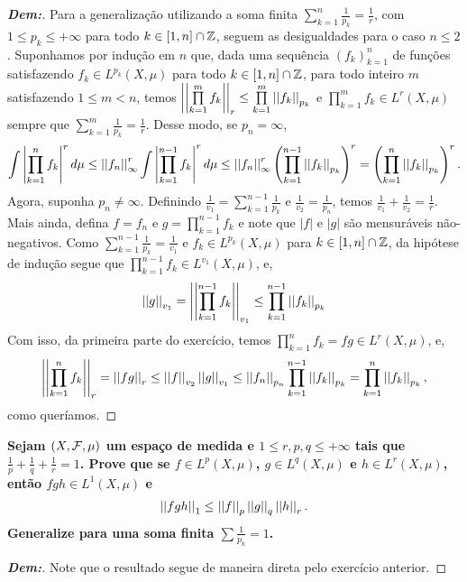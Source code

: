 \begin{proof}[\textbf{Dem:}]
  Para a generalização utilizando a soma finita 
  $\sum\limits_{k = 1}^n \frac{1}{p_k} = \frac{1}{r}$, com $1\le p_k \le +\infty$
  para todo $k \in [1, n] \cap \mbb Z$,
  seguem as desigualdades para o caso $n \le 2$. Suponhamos por indução em $n$ que, dada 
  uma sequência $(f_k)_{k=1}^n$ de funções satisfazendo $f_k \in L^{p_k}(X, \mu)$ para 
  todo $k \in [1, n] \cap \mbb Z$, 
  para todo inteiro $m$ satisfazendo $1 \le m < n$, temos 
  $\pnorm r {\prod\limits_{k = 1}^m f_k} \le \prod\limits_{k = 1}^m \pnorm {p_k} {f_k}$
  e $\prod_{k = 1}^m f_k \in L^r(X, \mu)$ sempre
  que $\sum\limits_{k = 1}^{m}\frac{1}{p_k} = \frac{1}{r}$. Desse modo, 
  se $p_n = \infty$, 
  \begin{align*}
    \int \mparth{\prod_{k = 1}^n f_k}^r d\mu 
    \le \pnorm \infty {f_n}^r \int \mparth{\prod_{k = 1}^{n-1} f_k}^r d\mu
    \le \pnorm \infty {f_n}^r \parth{\prod_{k = 1}^{n - 1}\pnorm {p_k}{f_k}}^r = 
    \parth{\prod_{k=1}^n \pnorm {p_k}{f_k}}^r.
  \end{align*}
  Agora, suponha $p_n \neq \infty$. Definindo 
  $\frac{1}{v_1} = \sum\limits_{k = 1}^{n-1} \frac{1}{p_k}$
  e $\frac{1}{v_2} = \frac{1}{p_n}$, temos $\frac{1}{v_1}+ \frac{1}{v_2} = \frac{1}{r}$. 
  Mais ainda, defina $f = f_n$ e $g = \prod\limits_{k=1}^{n-1} f_k$ e note que 
  $|f|$ e $|g|$ são mensuráveis não-negativos.  
  Como $\sum\limits_{k=1}^{n-1} \frac{1}{p_k} = \frac{1}{v_1}$ e 
  $f_k \in L^{p_k}(X, \mu)$ para $k \in [1, n]\cap \mbb Z$, da hipótese de indução 
  segue que $\prod\limits_{k=1}^{n-1} f_k \in L^{v_1}(X, \mu)$, e,
  \begin{align*}
    \pnorm {v_1} g = \pnorm {v_1} {\prod_{k=1}^{n-1} f_k} 
    \le \prod_{k=1}^{n-1}\pnorm {p_k} {f_k} 
  \end{align*}  
  Com isso, da primeira parte do 
  exercício, temos $\prod_{k=1}^n f_k = fg \in L^r(X, \mu)$, e,
  \begin{align*}
    \pnorm r {\prod_{k = 1}^n f_k} = \pnorm r {fg} \le 
    \pnorm {v_2} f \pnorm {v_1} g 
    \le \pnorm {p_n} {f_n} \prod\limits_{k=1}^{n-1} \pnorm {p_k}{f_k} = 
    \prod_{k = 1}^n \pnorm {p_k} {f_k},
  \end{align*}
  como queríamos.
\end{proof}

\textbf{Sejam $(X, \mcal F, \mu)$ um espaço de medida e $1 \le r, p, q \le +\infty$
tais que $\frac{1}{p} + \frac 1 q + \frac 1 r = 1$. Prove que 
se $f \in L^p (X, \mu)$, $g \in L^q(X, \mu)$ e $h \in L^r(X, \mu)$, 
então $fgh \in L^1(X, \mu)$ e 
\begin{align*}
  \pnorm 1 {fgh} \le \pnorm p f \pnorm q g \pnorm r h.
\end{align*}
Generalize para uma soma finita $\sum \frac{1}{p_k} = 1$.}
\begin{proof}[\textbf{Dem:}]Note que o resultado segue de maneira direta pelo 
  exercício anterior. 
\end{proof}

